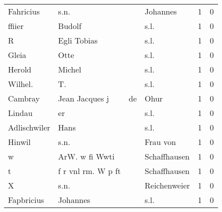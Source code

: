 \begin{center}
\begin{tiny}
\begin{longtabu}{llllrr}
                Fahricius &                               s.n. &             &                                    Johannes &          1 &         0 \\
                   ffiier &                             Budolf &             &                                        s.l. &          1 &         0 \\
                        R &                        Egli Tobias &             &                                        s.l. &          1 &         0 \\
                    Gleia &                               Otte &             &                                        s.l. &          1 &         0 \\
                   Herold &                             Michel &             &                                        s.l. &          1 &         0 \\
                  Wilhel. &                                 T. &             &                                        s.l. &          1 &         0 \\
                  Cambray &                     Jean Jacques j &          de &                                        Ohur &          1 &         0 \\
                   Lindau &                                 er &             &                                        s.l. &          1 &         0 \\
             Adlischwiler &                               Hans &             &                                        s.l. &          1 &         0 \\
                   Hinwil &                               s.n. &             &                                    Frau von &          1 &         0 \\
                        w &                     ArW. w fi Wwti &             &                                Schaffhausen &          1 &         0 \\
                        t &                 f r vnl rm. W p ft &             &                                Schaffhausen &          1 &         0 \\
                        X &                               s.n. &             &                                Reichenweier &          1 &         0 \\
               Fapbricius &                           Johannes &             &                                        s.l. &          1 &         0 \\

\end{longtabu}
\end{tiny}
\end{center}

